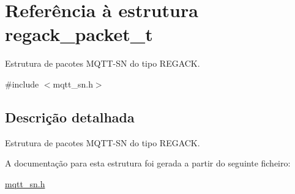 \hypertarget{structregack__packet__t}{\section{Referência à estrutura regack\+\_\+packet\+\_\+t}
\label{structregack__packet__t}
}


Estrutura de pacotes M\+Q\+T\+T-\/\+S\+N do tipo R\+E\+G\+A\+C\+K.  




{\ttfamily \#include $<$mqtt\+\_\+sn.\+h$>$}



\subsection{Descrição detalhada}
Estrutura de pacotes M\+Q\+T\+T-\/\+S\+N do tipo R\+E\+G\+A\+C\+K. 

A documentação para esta estrutura foi gerada a partir do seguinte ficheiro\+:\begin{DoxyCompactItemize}
\item 
\hyperlink{mqtt__sn_8h}{mqtt\+\_\+sn.\+h}\end{DoxyCompactItemize}
